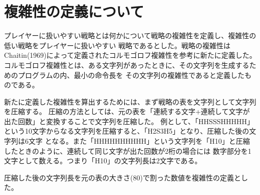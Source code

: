 \section{複雑性の定義について}

プレイヤーに扱いやすい戦略とは何かについて戦略の複雑性を定義し、複雑性の低い戦略をプレイヤーに扱いやすい
戦略であるとした。戦略の複雑性はChaitin(1969)によって定義されたコルモゴロフ複雑性を参考に新たに定義した。
コルモゴロフ複雑性とは、ある文字列があったときに、その文字列を生成するためのプログラムの内、最小の命令長を
その文字列の複雑性であると定義したものである。

新たに定義した複雑性を算出するためには、まず戦略の表を文字列として文字列を圧縮する。
圧縮の方法としては、元の表を「連続する文字+連続して文字が出た回数」と変換することで文字列を圧縮した。
例として、「HHSSSHHHHH」という10文字からなる文字列を圧縮すると、「H2S3H5」となり、圧縮した後の文字列は6文字
となる。また「HHHHHHHHHH」という文字列を「H10」と圧縮したときのように、連続して同じ文字が出た回数が2桁の場合には
数字部分を1文字として数える。つまり「H10」の文字列長は2文字である。

圧縮した後の文字列長を元の表の大きさ(80)で割った数値を複雑性の定義とした。
